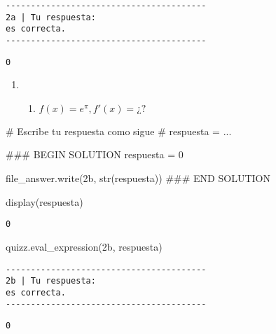 \documentclass[
  letterpaper,
  DIV=11,
  numbers=noendperiod]{scrreprt}
\newenvironment{Shaded}{\begin{snugshade}}{\end{snugshade}}
\newcommand{\BuiltInTok}[1]{\textcolor[rgb]{0.00,0.23,0.31}{#1}}
\newcommand{\CommentTok}[1]{\textcolor[rgb]{0.37,0.37,0.37}{#1}}
\newcommand{\DecValTok}[1]{\textcolor[rgb]{0.68,0.00,0.00}{#1}}
\newcommand{\NormalTok}[1]{\textcolor[rgb]{0.00,0.23,0.31}{#1}}
\newcommand{\OperatorTok}[1]{\textcolor[rgb]{0.37,0.37,0.37}{#1}}
\newcommand{\RegionMarkerTok}[1]{\textcolor[rgb]{0.00,0.23,0.31}{#1}}
\newcommand{\StringTok}[1]{\textcolor[rgb]{0.13,0.47,0.30}{#1}}
\providecommand{\tightlist}{%
  \setlength{\itemsep}{0pt}\setlength{\parskip}{0pt}}\usepackage{longtable,booktabs,array}
\begin{document}
\begin{verbatim}
----------------------------------------
2a | Tu respuesta:
es correcta.
----------------------------------------
\end{verbatim}

\begin{verbatim}
0
\end{verbatim}

\begin{enumerate}
\def\labelenumi{\arabic{enumi}.}
\setcounter{enumi}{1}
\tightlist
\item
  \begin{enumerate}
  \def\labelenumii{\alph{enumii}.}
  \setcounter{enumii}{1}
  \tightlist
  \item
    \(f(x) = e^{\pi}, f'(x)= ¿?\)
  \end{enumerate}
\end{enumerate}

\begin{Shaded}
\begin{Highlighting}[]
\CommentTok{\# Escribe tu respuesta como sigue }
\CommentTok{\# respuesta = ...}

\CommentTok{\#\#\# }\RegionMarkerTok{BEGIN}\CommentTok{ SOLUTION}
\NormalTok{respuesta }\OperatorTok{=} \DecValTok{0}

\NormalTok{file\_answer.write(}\StringTok{\textquotesingle{}2b\textquotesingle{}}\NormalTok{, }\BuiltInTok{str}\NormalTok{(respuesta))}
\CommentTok{\#\#\# }\RegionMarkerTok{END}\CommentTok{ SOLUTION}

\NormalTok{display(respuesta)}
\end{Highlighting}
\end{Shaded}

\begin{verbatim}
0
\end{verbatim}

\begin{Shaded}
\begin{Highlighting}[]
\NormalTok{quizz.eval\_expression(}\StringTok{\textquotesingle{}2b\textquotesingle{}}\NormalTok{, respuesta)}
\end{Highlighting}
\end{Shaded}

\begin{verbatim}
----------------------------------------
2b | Tu respuesta:
es correcta.
----------------------------------------
\end{verbatim}

\begin{verbatim}
0
\end{verbatim}
\end{document}
